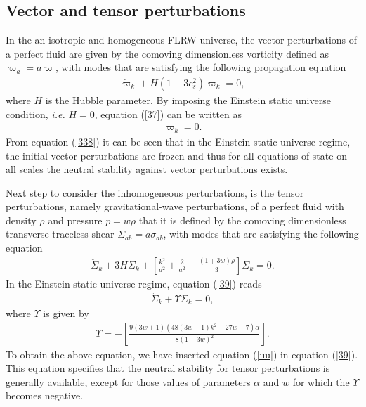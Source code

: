 \documentclass[showpacs,amsmath,nofootinbib,amssymb,epsfig]{revtex4}
\begin{document}
 \subsection{Vector and tensor perturbations}

In the an isotropic and homogeneous FLRW universe, the vector perturbations of a perfect fluid are given by the comoving dimensionless vorticity defined as ${\varpi}_{a}=a{\varpi}$, with modes that are satisfying the following propagation equation \cite{Barrow,Bruni}
\begin{eqnarray}\label{37}
\dot{\varpi}_{k}+H(1-3c_{s}^2){\varpi}_{k}=0,
\end{eqnarray}
where $H$ is the Hubble parameter.
By imposing  the Einstein static universe condition, {\it i.e.} $H=0$, equation (\ref{37}) can be written as
\begin{eqnarray}\label{338}
\dot{\varpi}_k=0.
\end{eqnarray}
From equation (\ref{338}) it can be seen that in the Einstein static universe regime, the initial vector perturbations are frozen and thus for all equations of state on all scales the neutral stability against vector perturbations exists.

Next step to consider the inhomogeneous perturbations, is the tensor perturbations, namely gravitational-wave perturbations, of a perfect
fluid with density $\rho$ and pressure $p=w\rho $ that it is defined by the comoving dimensionless transverse-traceless shear $\Sigma_{a b}=a\sigma_{a b}$, with modes that are satisfying the following equation \cite{Dunsby}
\begin{eqnarray}\label{39}
\ddot\Sigma_{k}+3H\dot\Sigma_{k}+\left[\frac{k^2}{a^2}+\frac{2}{a^2}-\frac{(1+3w)\rho}{3}\right]\Sigma_{k}=0.
\end{eqnarray}
In the Einstein static universe regime, equation (\ref{39}) reads
\begin{eqnarray}\label{40}
\ddot\Sigma_{k}+\Upsilon\Sigma_{k}=0,
\end{eqnarray}
where $\Upsilon$ is given by
\begin{eqnarray}\label{400}
\Upsilon=-\left[\frac{9 (3 w+1) \left(48 (3 w-1) k^2+27 w-7\right) \alpha }{8 (1-3 w)^2}\right].
\end{eqnarray}
To obtain the above equation, we have inserted equation (\ref{uu}) in equation (\ref{39}).
This equation specifies that the neutral stability for tensor perturbations
is generally available, except for those values of parameters $\alpha$ and $w$ for which the $\Upsilon$ becomes negative.
\end{document}
